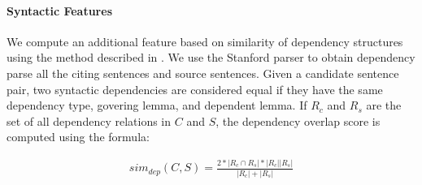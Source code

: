 \documentclass[11pt]{article}
\begin{document}
\paragraph{Syntactic Features} We compute an additional feature based on similarity of dependency structures using the method described in \cite{S13-1017} . We use the Stanford parser to obtain dependency parse all the citing sentences and source sentences. Given a candidate sentence pair, two syntactic dependencies are considered equal if they have the same dependency type, govering lemma, and dependent lemma. If $R_c$ and $R_s$ are the set of all dependency relations in $C$ and $S$, the dependency overlap score is computed using the formula:

\begin{eqnarray*}
  sim_{dep}(C,S) = \frac{2*|R_c \cap R_s| * |R_c||R_s|}{|R_c|+|R_s|}
\end{eqnarray*}




\end{document}
